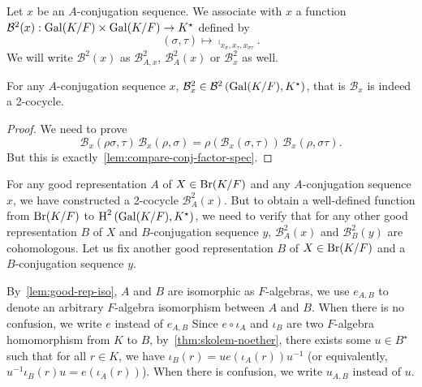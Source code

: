 \begin{construction}
  \label{con:good-rep-to-2-cocycles}
  Let $x$ be an $A$-conjugation sequence. We associate with $x$ a function $\mathcal{B}^{2}(x) : \operatorname{Gal}(K/F)\times\operatorname{Gal}(K/F)\to K^{\star}$ defined by
  \[
    (\sigma,\tau)\mapsto \comp_{x_{\sigma},x_{\tau},x_{\sigma\tau}}.
  \]
  We will write $\mathcal{B}^{2}(x)$ as $\mathcal{B}^{2}_{A, x}$, $\mathcal{B}^{2}_{A}(x)$ or $\mathcal{B}^{2}_{x}$ as well.
  \leanok
\end{construction}

\begin{lemma}
  For any $A$-conjugation sequence $x$, $\mathcal{B}^{2}_{x} \in \mathcal{B}^{2}\left(\operatorname{Gal}(K/F), K^{\star}\right)$, that is $\mathcal{B}_{x}$ is indeed a 2-cocycle.
  \leanok
\end{lemma}

\begin{proof}
  We need to prove
  \[
    \mathcal{B}_{x}(\rho\sigma, \tau)\, \mathcal{B}_{x}(\rho,\sigma) = \rho\left(\mathcal{B}_{x}(\sigma, \tau)\right)\, \mathcal{B}_{x}(\rho, \sigma\tau).
  \]
  But this is exactly~\cref{lem:compare-conj-factor-spec}.
\end{proof}

For any good representation $A$ of $X \in \operatorname{Br}(K/F)$ and any $A$-conjugation sequence $x$, we have constructed a 2-cocycle $\mathcal{B}^{2}_{A}(x)$. But to obtain a well-defined function from $\operatorname{Br}(K/F)$ to $\operatorname{H}^{2}\left(\operatorname{Gal}(K/F), K^{\star}\right)$, we need to verify that for any other good representation $B$ of $X$ and $B$-conjugation sequence $y$, $\mathcal{B}^{2}_{A}(x)$ and $\mathcal{B}^{2}_{B}(y)$ are cohomologous. Let us fix another good representation $B$ of $X \in \operatorname{Br}(K/F)$ and a $B$-conjugation sequence $y$.

\begin{construction}\label{con:good-rep-iso-coeff}
  By~\cref{lem:good-rep-iso}, $A$ and $B$ are isomorphic as $F$-algebras, we use $e_{A,B}$ to denote an arbitrary $F$-algebra isomorphism between $A$ and $B$. When there is no confusion, we write $e$ instead of $e_{A, B}$ Since $e \circ \iota_{A}$ and $\iota_{B}$ are two $F$-algebra homomorphism from $K$ to $B$, by~\cref{thm:skolem-noether}, there exists some $u \in B^{\star}$ such that for all $r \in K$, we have $\iota_{B}(r) = ue\left(\iota_{A}(r)\right)u^{-1}$ (or equivalently, $u^{-1}\iota_{B}(r)u = e\left(\iota_{A}(r)\right)$). When there is confusion, we write $u_{A, B}$ instead of $u$.
\end{construction}


